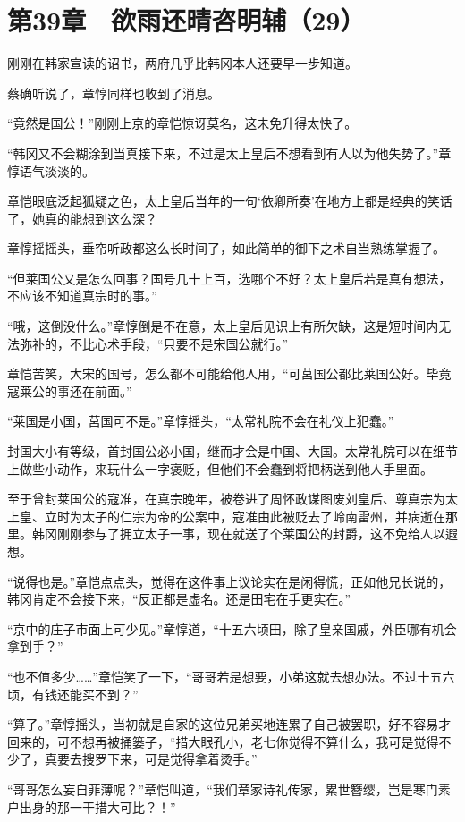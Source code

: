 \section{第39章　欲雨还晴咨明辅（29）}

刚刚在韩家宣读的诏书，两府几乎比韩冈本人还要早一步知道。

蔡确听说了，章惇同样也收到了消息。

“竟然是国公！”刚刚上京的章恺惊讶莫名，这未免升得太快了。

“韩冈又不会糊涂到当真接下来，不过是太上皇后不想看到有人以为他失势了。”章惇语气淡淡的。

章恺眼底泛起狐疑之色，太上皇后当年的一句‘依卿所奏’在地方上都是经典的笑话了，她真的能想到这么深？

章惇摇摇头，垂帘听政都这么长时间了，如此简单的御下之术自当熟练掌握了。

“但莱国公又是怎么回事？国号几十上百，选哪个不好？太上皇后若是真有想法，不应该不知道真宗时的事。”

“哦，这倒没什么。”章惇倒是不在意，太上皇后见识上有所欠缺，这是短时间内无法弥补的，不比心术手段，“只要不是宋国公就行。”

章恺苦笑，大宋的国号，怎么都不可能给他人用，“可莒国公都比莱国公好。毕竟寇莱公的事还在前面。”

“莱国是小国，莒国可不是。”章惇摇头，“太常礼院不会在礼仪上犯蠢。”

封国大小有等级，首封国公必小国，继而才会是中国、大国。太常礼院可以在细节上做些小动作，来玩什么一字褒贬，但他们不会蠢到将把柄送到他人手里面。

至于曾封莱国公的寇准，在真宗晚年，被卷进了周怀政谋图废刘皇后、尊真宗为太上皇、立时为太子的仁宗为帝的公案中，寇准由此被贬去了岭南雷州，并病逝在那里。韩冈刚刚参与了拥立太子一事，现在就送了个莱国公的封爵，这不免给人以遐想。

“说得也是。”章恺点点头，觉得在这件事上议论实在是闲得慌，正如他兄长说的，韩冈肯定不会接下来，“反正都是虚名。还是田宅在手更实在。”

“京中的庄子市面上可少见。”章惇道，“十五六顷田，除了皇亲国戚，外臣哪有机会拿到手？”

“也不值多少……”章恺笑了一下，“哥哥若是想要，小弟这就去想办法。不过十五六顷，有钱还能买不到？”

“算了。”章惇摇头，当初就是自家的这位兄弟买地连累了自己被罢职，好不容易才回来的，可不想再被捅篓子，“措大眼孔小，老七你觉得不算什么，我可是觉得不少了，真要去搜罗下来，可是觉得拿着烫手。”

“哥哥怎么妄自菲薄呢？”章恺叫道，“我们章家诗礼传家，累世簪缨，岂是寒门素户出身的那一干措大可比？！”

